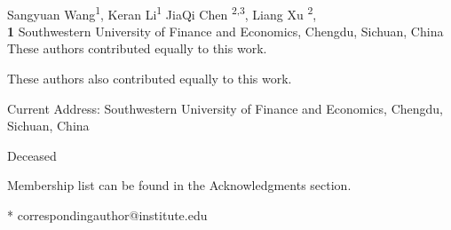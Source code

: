 \documentclass[10pt,letterpaper]{article}
\begin{document}
\vspace*{0.2in}

\begin{flushleft}
{\Large
\textbf{} %
}
\newline
\\
Sangyuan Wang\textsuperscript{1\Yinyang},
Keran Li\textsuperscript{1\Yinyang}
JiaQi Chen \textsuperscript{2,3\textcurrency},
 Liang Xu \textsuperscript{2},
\\
\bigskip
\textbf{1} Southwestern University of Finance and Economics, Chengdu, Sichuan, China
\\

%
%
\Yinyang These authors contributed equally to this work.

\ddag These authors also contributed equally to this work.

\textcurrency Current Address: Southwestern University of Finance and Economics, Chengdu, Sichuan, China %

\dag Deceased

\textpilcrow Membership list can be found in the Acknowledgments section.

* correspondingauthor@institute.edu

\end{flushleft}
\end{document}
